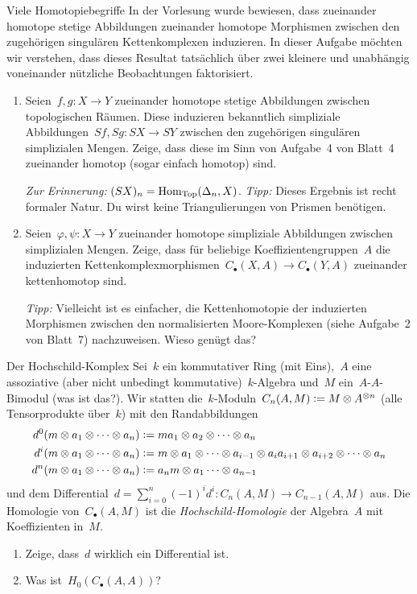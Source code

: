 \documentclass{uebblatt}
\begin{document}
\begin{aufgabe}{Viele Homotopiebegriffe}
In der Vorlesung wurde bewiesen, dass zueinander homotope stetige Abbildungen
zueinander homotope Morphismen zwischen den zugehörigen singulären
Kettenkomplexen induzieren. In dieser Aufgabe möchten wir verstehen, dass
dieses Resultat tatsächlich über zwei kleinere und unabhängig voneinander
nützliche Beobachtungen faktorisiert.
\begin{enumerate}
\item Seien~$f, g : X \to Y$ zueinander homotope stetige Abbildungen zwischen
topologischen Räumen. Diese induzieren bekanntlich simpliziale Abbildungen~$Sf,
Sg : SX \to SY$ zwischen den zugehörigen singulären simplizialen Mengen. Zeige,
dass diese im Sinn von Aufgabe~4 von Blatt~4 zueinander homotop (sogar einfach
homotop) sind.

\emph{Zur Erinnerung:} $(SX)_n = \mathrm{Hom}_{\mathrm{Top}}(\Delta_n,X)$.
\emph{Tipp:} Dieses Ergebnis ist recht formaler Natur. Du wirst keine
Triangulierungen von Prismen benötigen.

\item Seien~$\varphi, \psi : X \to Y$ zueinander homotope simpliziale
Abbildungen zwischen simplizialen Mengen. Zeige, dass für beliebige
Koeffizientengruppen~$A$ die induzierten
Kettenkomplexmorphismen~$C_\bullet(X,A) \to C_\bullet(Y,A)$ zueinander
kettenhomotop sind.

\emph{Tipp:} Vielleicht ist es einfacher, die Kettenhomotopie der induzierten
Morphismen zwischen den normalisierten Moore-Komplexen (siehe Aufgabe~2 von
Blatt~7) nachzuweisen. Wieso genügt das?
\end{enumerate}
\end{aufgabe}

\newpage

\begin{aufgabe}{Der Hochschild-Komplex}
Sei~$k$ ein kommutativer Ring (mit Eins),~$A$ eine assoziative (aber nicht
unbedingt kommutative)~$k$-Algebra und~$M$ ein~$A$-$A$-Bimodul (was ist das?).
Wir statten die~$k$-Moduln~$C_n(A,M) \vcentcolon= M \otimes A^{\otimes n}$ (alle
Tensorprodukte über~$k$) mit den Randabbildungen
\begin{align*}
  d^0(m \otimes a_1 \otimes \cdots \otimes a_n) &\vcentcolon=
    ma_1 \otimes a_2 \otimes \cdots \otimes a_n \\
  d^i(m \otimes a_1 \otimes \cdots \otimes a_n) &\vcentcolon=
    m \otimes a_1 \otimes \cdots \otimes a_{i-1} \otimes a_i a_{i+1} \otimes
    a_{i+2} \otimes \cdots \otimes a_n \\
  d^n(m \otimes a_1 \otimes \cdots \otimes a_n) &\vcentcolon=
    a_n m \otimes a_1 \cdots \otimes a_{n-1}
\end{align*}
und dem Differential~$d = \sum_{i=0}^n (-1)^i d^i : C_n(A,M) \to C_{n-1}(A,M)$
aus. Die Homologie von~$C_\bullet(A,M)$ ist die \emph{Hochschild-Homologie} der
Algebra~$A$ mit Koeffizienten in~$M$.
\begin{enumerate}
\item Zeige, dass~$d$ wirklich ein Differential ist.
\item Was ist~$H_0(C_\bullet(A,A))$?
\end{enumerate}
\end{aufgabe}
\end{document}
